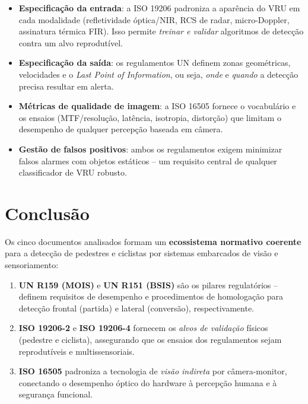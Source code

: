 \documentclass[11pt,a4paper]{article}
\begin{document}
\begin{itemize}[leftmargin=1.4em,itemsep=2pt]
  \item \textbf{Especificação da entrada}: a ISO 19206 padroniza a aparência do
        VRU em cada modalidade (refletividade óptica/NIR, RCS de radar,
        micro-Doppler, assinatura térmica FIR). Isso permite \emph{treinar e
        validar} algoritmos de detecção contra um alvo reprodutível.
  \item \textbf{Especificação da saída}: os regulamentos UN definem zonas
        geométricas, velocidades e o \emph{Last Point of Information}, ou seja,
        \emph{onde} e \emph{quando} a detecção precisa resultar em alerta.
  \item \textbf{Métricas de qualidade de imagem}: a ISO 16505 fornece o
        vocabulário e os ensaios (MTF/resolução, latência, isotropia,
        distorção) que limitam o desempenho de qualquer percepção baseada em
        câmera.
  \item \textbf{Gestão de falsos positivos}: ambos os regulamentos exigem
        minimizar falsos alarmes com objetos estáticos -- um requisito central
        de qualquer classificador de VRU robusto.
\end{itemize}

\section{Conclusão}

Os cinco documentos analisados formam um \textbf{ecossistema normativo coerente}
para a detecção de pedestres e ciclistas por sistemas embarcados de visão e
sensoriamento:

\begin{enumerate}[leftmargin=1.5em,itemsep=3pt]
  \item \textbf{UN R159 (MOIS)} e \textbf{UN R151 (BSIS)} são os pilares
        regulatórios -- definem requisitos de desempenho e procedimentos de
        homologação para detecção frontal (partida) e lateral (conversão),
        respectivamente.
  \item \textbf{ISO 19206-2} e \textbf{ISO 19206-4} fornecem os \emph{alvos de
        validação} físicos (pedestre e ciclista), assegurando que os ensaios
        dos regulamentos sejam reprodutíveis e multissensoriais.
  \item \textbf{ISO 16505} padroniza a tecnologia de \emph{visão indireta} por
        câmera-monitor, conectando o desempenho óptico do hardware à percepção
        humana e à segurança funcional.
\end{enumerate}
\end{document}
